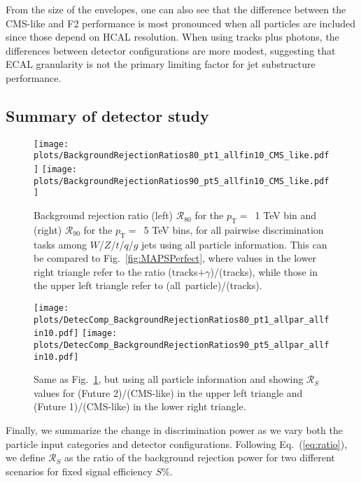\documentclass[11pt,letterpaper]{article}
\DeclareRobustCommand{\Fig}[1]{Fig.~\ref{#1}}
\DeclareRobustCommand{\Eq}[1]{Eq.~(\ref{#1})}
\newcommand{\pt}{p_{\mathrm{T}}}
\begin{document}
From the size of the envelopes, one can also see that the difference between the CMS-like and F2 performance is most pronounced when all particles are included since those depend on HCAL resolution.
%
When using tracks plus photons, the differences between detector configurations are more modest, suggesting that ECAL granularity is not the primary limiting factor for jet substructure performance.

\subsection{Summary of detector study}
\label{sec:detector:summary}


\begin{figure}[p]
\begin{center}
\texttt{[image: plots/BackgroundRejectionRatios80\_pt1\_allfin10\_CMS\_like.pdf]}
\texttt{[image: plots/BackgroundRejectionRatios90\_pt5\_allfin10\_CMS\_like.pdf]}
\end{center}
\caption{Background rejection ratio (left) $\mathcal{R}_{80}$ for the $\pt =$~1 TeV bin and (right) $\mathcal{R}_{90}$ for the $\pt =$~5 TeV bins, for all pairwise discrimination tasks among $W$/$Z$/$t$/$q$/$g$ jets using all particle information.  This can be compared to \Fig{fig:MAPSPerfect}, where values in the lower right triangle refer to the ratio (tracks$+\gamma$)/(tracks), while those in the upper left triangle refer to (all~particle)/(tracks).}
\label{fig:MAPS5TeV_1}
\end{figure}

\begin{figure}[p]
\begin{center}
\texttt{[image: plots/DetecComp\_BackgroundRejectionRatios80\_pt1\_allpar\_allfin10.pdf]}
\texttt{[image: plots/DetecComp\_BackgroundRejectionRatios90\_pt5\_allpar\_allfin10.pdf]}
\end{center}
\caption{Same as \Fig{fig:MAPS5TeV_1}, but using all particle information and showing $\mathcal{R}_{S}$ values for (Future 2)/(CMS-like) in the upper left triangle and (Future 1)/(CMS-like) in the lower right triangle.}
\label{fig:MAPS5TeV_2}
\end{figure}

Finally, we summarize the change in discrimination power as we vary both the particle input categories and detector configurations.
%
Following \Eq{eq:ratio}, we define $\mathcal{R}_S$ as the ratio of the background rejection power for two different scenarios for fixed signal efficiency $S\%$.
%
\end{document}
